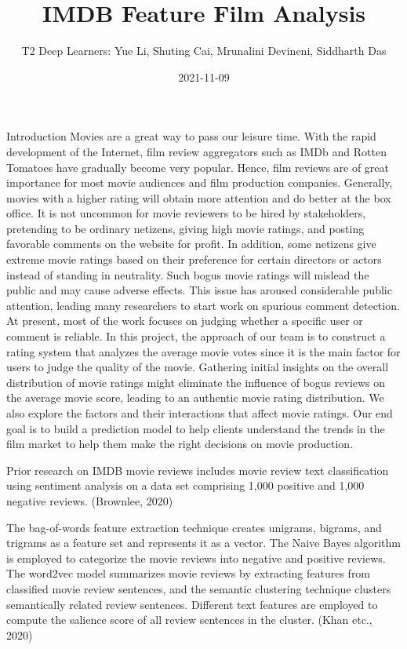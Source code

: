 \documentclass[
  ignorenonframetext,
]{beamer}
\title{IMDB Feature Film Analysis}
\author{T2 Deep Learners: Yue Li, Shuting Cai, Mrunalini Devineni,
Siddharth Das}
\date{2021-11-09}
\begin{document}
\frame{\titlepage}

\begin{frame}{Introduction}
\protect\hypertarget{introduction}{}
Movies are a great way to pass our leisure time. With the rapid
development of the Internet, film review aggregators such as IMDb and
Rotten Tomatoes have gradually become very popular. Hence, film reviews
are of great importance for most movie audiences and film production
companies. Generally, movies with a higher rating will obtain more
attention and do better at the box office. It is not uncommon for movie
reviewers to be hired by stakeholders, pretending to be ordinary
netizens, giving high movie ratings, and posting favorable comments on
the website for profit. In addition, some netizens give extreme movie
ratings based on their preference for certain directors or actors
instead of standing in neutrality. Such bogus movie ratings will mislead
the public and may cause adverse effects. This issue has aroused
considerable public attention, leading many researchers to start work on
spurious comment detection. At present, most of the work focuses on
judging whether a specific user or comment is reliable. In this project,
the approach of our team is to construct a rating system that analyzes
the average movie votes since it is the main factor for users to judge
the quality of the movie. Gathering initial insights on the overall
distribution of movie ratings might eliminate the influence of bogus
reviews on the average movie score, leading to an authentic movie rating
distribution. We also explore the factors and their interactions that
affect movie ratings. Our end goal is to build a prediction model to
help clients understand the trends in the film market to help them make
the right decisions on movie production.

Prior research on IMDB movie reviews includes movie review text
classification using sentiment analysis on a data set comprising 1,000
positive and 1,000 negative reviews. (Brownlee, 2020)

The bag-of-words feature extraction technique creates unigrams, bigrams,
and trigrams as a feature set and represents it as a vector. The Naive
Bayes algorithm is employed to categorize the movie reviews into
negative and positive reviews. The word2vec model summarizes movie
reviews by extracting features from classified movie review sentences,
and the semantic clustering technique clusters semantically related
review sentences. Different text features are employed to compute the
salience score of all review sentences in the cluster. (Khan etc., 2020)
\end{frame}
\end{document}
